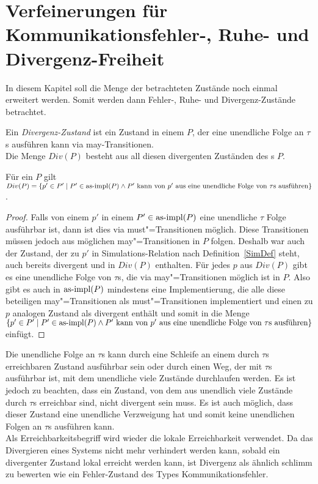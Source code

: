 \chapter{Verfeinerungen für Kommunikationsfehler-, Ruhe- und Divergenz-Freiheit}

In diesem Kapitel soll die Menge der betrachteten Zustände noch einmal
erweitert werden. Somit werden dann Fehler-, Ruhe- und Divergenz-Zustände
betrachtet.

\begin{Def}[Divergenz]
  Ein \emph{Divergenz-Zustand} ist ein Zustand in einem \MEIO{} $P$, der eine
  unendliche Folge an $\tau$s ausführen kann via may-Transitionen.\\
  Die Menge $Div(P)$ besteht aus all diesen divergenten Zuständen des \MEIO{}s
  $P$.
\end{Def}

\begin{Prop}
  \label{DivProp}
  Für ein \MEIO{} $P$ gilt $Div (P) = \left\{p'\in P'\mid P'\in\mathrm{as}\text{-}\mathrm{impl} (P)
  \land P' \text{ kann von } p' \text{ aus eine unendliche Folge von } \tau
  \text{s ausführen} \right\}$.
\end{Prop}

\begin{proof}
  Falls von einem $p'$ in einem $P'\in\mathrm{as}\text{-}\mathrm{impl} (P)$ eine unendliche $\tau$ Folge
  ausführbar ist, dann ist dies via must"=Transitionen möglich. Diese
  Transitionen müssen jedoch aus möglichen may"=Transitionen in $P$ folgen.
  Deshalb war auch der Zustand, der zu $p'$ in Simulations-Relation nach
  Definition~\ref{SimDef} steht, auch bereits divergent und in $Div (P)$
  enthalten. Für jedes $p$ aus $Div (P)$ gibt es eine unendliche Folge von
  $\tau$s, die via may"=Transitionen möglich ist in $P$. Also gibt es auch in
  $\mathrm{as}\text{-}\mathrm{impl} (P)$ mindestens eine Implementierung, die alle diese beteiligen
  may"=Transitionen als must"=Transitionen implementiert und einen zu $p$
  analogen Zustand als divergent enthält und somit in die Menge $\left\{p'\in
  P'\mid P'\in\mathrm{as}\text{-}\mathrm{impl} (P) \land P' \text{ kann von } p' \text{ aus eine
  unendliche Folge von } \tau \text{s ausführen} \right\}$ einfügt.
\end{proof}

Die unendliche Folge an $\tau$s kann durch eine Schleife an einem durch $\tau$s
erreichbaren Zustand ausführbar sein oder durch einen Weg, der mit $\tau$s
ausführbar ist, mit dem unendliche viele Zustände durchlaufen werden. Es ist
jedoch zu beachten, dass ein Zustand, von dem aus unendlich viele Zustände
durch $\tau$s  erreichbar sind, nicht divergent sein muss. Es ist auch möglich,
dass dieser Zustand eine unendliche Verzweigung hat und somit keine unendlichen
Folgen an $\tau$s ausführen kann.\\
Als Erreichbarkeitsbegriff wird wieder die lokale Erreichbarkeit verwendet. Da
das Divergieren eines Systems nicht mehr verhindert werden kann, sobald ein
divergenter Zustand lokal erreicht werden kann, ist Divergenz als ähnlich \glqq
schlimm\grqq{} zu bewerten wie ein Fehler-Zustand des Types
Kommunikationsfehler.

